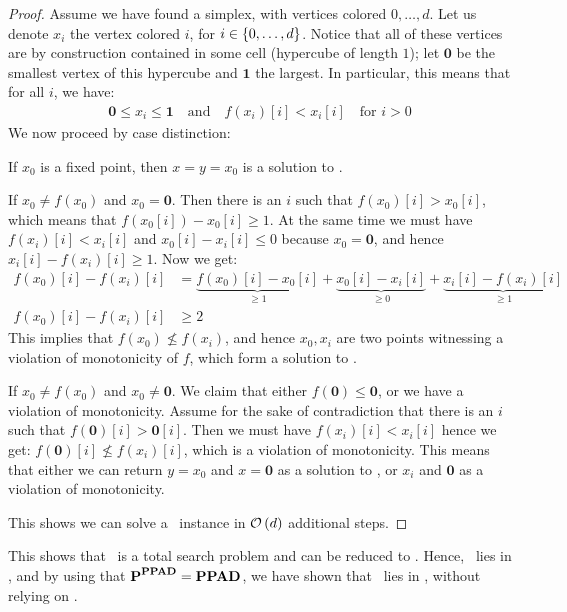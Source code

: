 \begin{proof}
	Assume we have found a simplex, with vertices colored $0, \dots, d$. Let us denote $x_i$ the vertex colored $i$, for $i \in \left\{0, \dots, d\right\}$. Notice that all of these vertices are by construction contained in some cell (hypercube of length $1$); let $\mathbf{0}$ be the smallest vertex of this hypercube and $\mathbf{1}$ the largest. In particular, this means that for all $i$, we have:
	\begin{align*}
		\mathbf{0} \leq x_i \leq \mathbf{1} \quad \text{and} \quad f(x_i)[i] < x_i[i] \quad \text{for $i > 0$}
	\end{align*}
	We now proceed by case distinction:
	\begin{case}{1}
		If $x_0$ is a fixed point, then $x = y = x_0$ is a solution to \Tarskistar.
	\end{case}
	\begin{case}{2}
		If $x_0 \neq f(x_0)$ and $x_0 = \mathbf{0}$. Then there is an $i$ such that $f(x_0)[i] > x_0[i]$, which means that $f(x_0[i]) - x_0[i] \geq 1$. At the same time we must have $f(x_i)[i] < x_i[i]$ and $x_0[i] - x_i[i] \leq 0$ because $x_0 = \mathbf{0}$, and hence $x_i[i] - f(x_i)[i] \geq 1$. Now we get:
		\begin{align*}
			f(x_0)[i] - f(x_i)[i] & = \underbrace{f(x_0)[i] - x_0[i]}_{\geq 1} + \underbrace{x_0[i] - x_i[i]}_{\geq 0} + \underbrace{x_i[i] - f(x_i)[i]}_{\geq 1} \\
			f(x_0)[i] - f(x_i)[i] & \geq 2
		\end{align*}
		This implies that $f(x_0) \not \leq f(x_i)$, and hence $x_0, x_i$ are two points witnessing a violation of monotonicity of $f$, which form a solution to \Tarskistar.
	\end{case}
	\begin{case}{3}
		If $x_0 \neq f(x_0)$ and $x_0 \neq \mathbf{0}$. We claim that either $f(\mathbf{0}) \leq \mathbf{0}$, or we have a violation of monotonicity. Assume for the sake of contradiction that there is an $i$ such that $f(\mathbf{0})[i] > \mathbf{0}[i]$. Then we must have $f(x_i)[i] < x_i[i]$ hence we get: $f(\mathbf{0})[i] \not\leq f(x_i)[i]$, which is a violation of monotonicity. This means that either we can return $y = x_0$ and $x = \mathbf{0}$ as a solution to \Tarskistar, or $x_i$ and $\mathbf{0}$ as a violation of monotonicity.
	\end{case}
	This shows we can solve a \Tarskistar\ instance in $\mathcal{O}\left(d\right)$ additional steps.
\end{proof}
This shows that \Tarskistar\ is a total search problem and can be reduced to \Sperner. Hence, \Tarskistar\ lies in \PPAD, and by using that $\textbf{P}^{\textbf{PPAD}} = \textbf{PPAD}$, we have shown that \Tarski\ lies in \PPAD, without relying on \Brouwer.

